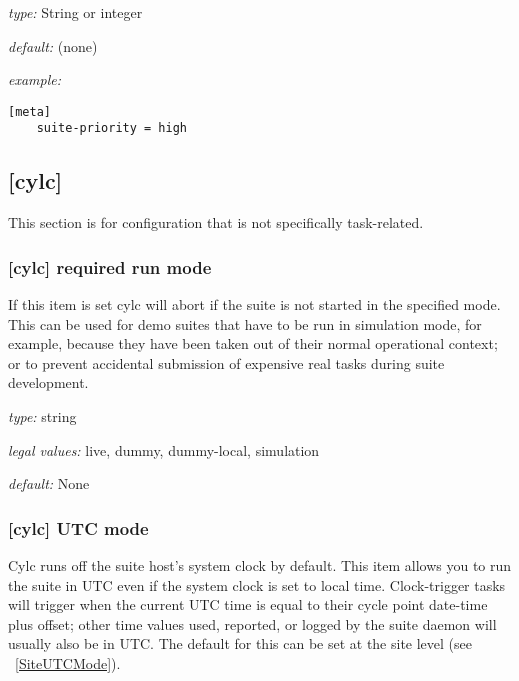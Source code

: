 \begin{myitemize}
\item {\em type:} String or integer
\item {\em default:} (none)
\item {\em example:}
    \begin{lstlisting}
[meta]
    suite-priority = high
    \end{lstlisting}
\end{myitemize}


\subsection{[cylc]}

This section is for configuration that is not specifically task-related.

\subsubsection[required run mode]{ [cylc] \textrightarrow required run mode}

If this item is set cylc will abort if the suite is not started in the
specified mode. This can be used for demo suites that have to be
run in simulation mode, for example, because they have been taken out of
their normal operational context; or to prevent accidental submission of
expensive real tasks during suite development.
\begin{myitemize}
    \item {\em type:} string
    \item {\em legal values:} live, dummy, dummy-local, simulation
    \item {\em default:} None
\end{myitemize}

\subsubsection[UTC mode]{ [cylc] \textrightarrow UTC mode}
\label{UTC-mode}

Cylc runs off the suite host's system clock by default. This item allows
you to run the suite in UTC even if the system clock is set to local time.
Clock-trigger tasks will trigger when the current UTC time is equal to
their cycle point date-time plus offset; other time values used, reported,
or logged by the suite daemon will usually also be in UTC. The default for
this can be set at the site level (see ~\ref{SiteUTCMode}).

